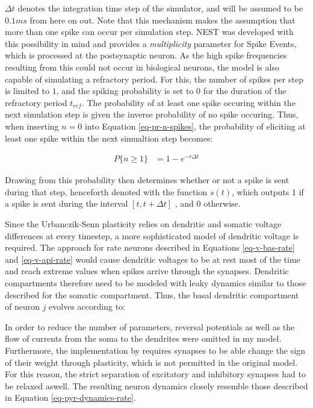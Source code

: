 $\Delta t$ denotes the integration time step of the simulator, and will be assumed to be $0.1 ms$ from here on out. Note
that this mechanism makes the assumption that more than one spike can occur per simulation step. NEST was developed with
this possibility in mind and provides a \textit{multiplicity} parameter for Spike Events, which is processed at the
postsynaptic neuron. As the high spike frequencies resulting from this could not occur in biological neurons, the model
is also capable of simulating a refractory period. For this, the number of spikes per step is limited to $1$, and the
spiking probability is set to 0 for the duration of the refractory period $t_{ref}$. The probability of at least one
spike occuring within the next simulation step is given the inverse probability of no spike occuring. Thus, when
inserting $n=0$ into Equation \ref{eq-pr-n-spikes}, the probability of eliciting at least one spike within the next
simualtion step becomes:

\begin{align}
  P\{ \textit{n} \geq 1\} & = 1 - e^{-r \Delta t}
\end{align}


Drawing from this probability then determines whether or not a spike is sent during that step, henceforth denoted with
the function $s(t)$, which outputs $1$ if a spike is sent during the interval $[t, t+\Delta t]$ , and $0$ otherwise. \newline

Since the Urbanczik-Senn plasticity relies on dendritic and somatic voltage differences at every timestep, a more
sophisticated model of dendritic voltage is required. The approach for rate neurons described in Equations
\ref{eq-v-bas-rate} and \ref{eq-v-api-rate} would cause dendritic voltages to be at rest most of the time and reach
extreme values when spikes arrive through the synapses. Dendritic compartments therefore need to be modeled with leaky
dynamics similar to those described for the somatic compartment. Thus, the basal dendritic compartment of neuron $j$
evolves according to: 

In order to reduce the number of parameters, reversal potentials as well as the flow of currents from the soma to the
dendrites were omitted in my model. Furthermore, the implementation by \cite{sacramento2018dendritic} requires synapses
to be able change the sign of their weight through plasticity, which is not permitted in the original model. For this
reason, the strict separation of excitatory and inhibitory synapses had to be relaxed aswell. The resulting neuron
dynamics closely resemble those described in Equation \ref{eq-pyr-dynamics-rate}.

